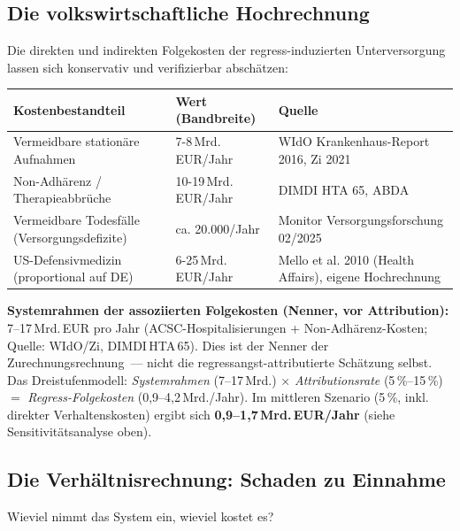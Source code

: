 \documentclass{umbruch-position}
\begin{document}
\subsection{Die volkswirtschaftliche Hochrechnung}

Die direkten und indirekten Folgekosten der regress-induzierten Unterversorgung lassen sich konservativ und verifizierbar abschätzen:

{\small
\begin{tabularx}{\textwidth}{X X X}
\toprule
\textbf{Kostenbestandteil} & \textbf{Wert (Bandbreite)} & \textbf{Quelle} \\
\midrule
Vermeidbare stationäre Aufnahmen & 7-8\,Mrd.\,EUR/Jahr & WIdO Krankenhaus-Report 2016, Zi 2021 \\
Non-Adhärenz / Therapieabbrüche & 10-19\,Mrd.\,EUR/Jahr & DIMDI HTA 65, ABDA \\
Vermeidbare Todesfälle (Versorgungsdefizite) & ca. 20.000/Jahr & Monitor Versorgungsforschung 02/2025 \\
US-Defensivmedizin (proportional auf DE) & 6-25\,Mrd.\,EUR/Jahr & Mello et al. 2010 (Health Affairs), eigene Hochrechnung \\
\bottomrule
\end{tabularx}
}

\textbf{Systemrahmen der assoziierten Folgekosten (Nenner, vor Attribution):} 7--17\,Mrd.\,EUR pro Jahr (ACSC-Hospitalisierungen + Non-Adhärenz-Kosten; Quelle: WIdO/Zi, DIMDI\,HTA\,65). Dies ist der Nenner der Zurechnungsrechnung~--- nicht die regressangst-attributierte Schätzung selbst. Das Dreistufenmodell: \emph{Systemrahmen} (7--17\,Mrd.) $\times$ \emph{Attributionsrate} (5\,\%--15\,\%) $=$ \emph{Regress-Folgekosten} (0,9--4,2\,Mrd./Jahr). Im mittleren Szenario (5\,\%, inkl. direkter Verhaltenskosten) ergibt sich \textbf{0,9--1,7\,Mrd.\,EUR/Jahr} (siehe Sensitivitätsanalyse oben).

\subsection{Die Verhältnisrechnung: Schaden zu Einnahme}

Wieviel nimmt das System ein, wieviel kostet es?
\end{document}
